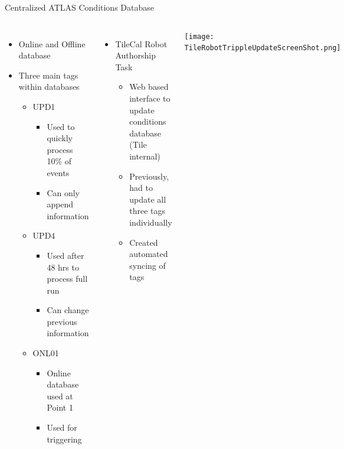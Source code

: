 \documentclass[aspectratio=169,xcolor=table]{beamer}
\begin{document}
    \begin{frame}[t]{Centralized ATLAS Conditions Database}
      \begin{columns}
        \begin{itemize}
            \item Online and Offline database
            \item Three main tags within databases
          \begin{itemize}
            \item UPD1
            \begin{itemize}
              \item Used to quickly process 10\% of events
              \item Can only append information
            \end{itemize}
            \item UPD4
            \begin{itemize}
              \item Used after 48 hrs to process full run
              \item Can change previous information
            \end{itemize}
            \item ONL01
            \begin{itemize}
              \item Online database used at Point 1
              \item Used for triggering
            \end{itemize}
          \end{itemize}
        \end{itemize}

        \begin{itemize}
          \item TileCal Robot Authorship Task
          \begin{itemize}
            \item Web based interface to update conditions database (Tile internal)
            \item Previously, had to update all three tags individually
            \item Created automated syncing of tags
          \end{itemize}
        \end{itemize}
        \centering
        \texttt{[image: TileRobotTrippleUpdateScreenShot.png]}
      \end{columns}
    \end{frame}
\end{document}
